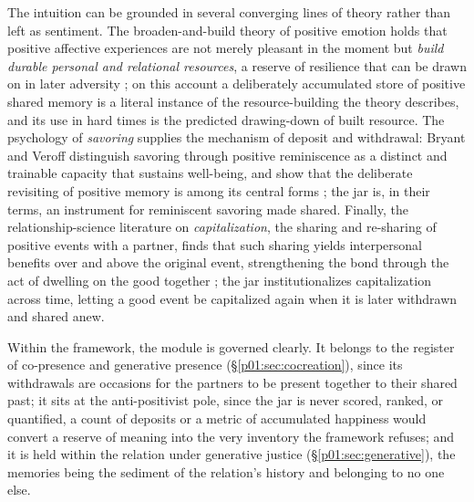 \documentclass[11pt,a4paper]{article}
\begin{document}
The intuition can be grounded in several converging lines of theory rather than left as sentiment. The broaden-and-build theory of positive emotion holds that positive affective experiences are not merely pleasant in the moment but \emph{build durable personal and relational resources}, a reserve of resilience that can be drawn on in later adversity \parencite{fredrickson2001role}; on this account a deliberately accumulated store of positive shared memory is a literal instance of the resource-building the theory describes, and its use in hard times is the predicted drawing-down of built resource. The psychology of \emph{savoring} supplies the mechanism of deposit and withdrawal: Bryant and Veroff distinguish savoring through positive reminiscence as a distinct and trainable capacity that sustains well-being, and show that the deliberate revisiting of positive memory is among its central forms \parencite{bryant2007savoring}; the jar is, in their terms, an instrument for reminiscent savoring made shared. Finally, the relationship-science literature on \emph{capitalization}, the sharing and re-sharing of positive events with a partner, finds that such sharing yields interpersonal benefits over and above the original event, strengthening the bond through the act of dwelling on the good together \parencite{gable2004what}; the jar institutionalizes capitalization across time, letting a good event be capitalized again when it is later withdrawn and shared anew.

Within the framework, the module is governed clearly. It belongs to the register of co-presence and generative presence (§\ref{p01:sec:cocreation}), since its withdrawals are occasions for the partners to be present together to their shared past; it sits at the anti-positivist pole, since the jar is never scored, ranked, or quantified, a count of deposits or a metric of accumulated happiness would convert a reserve of meaning into the very inventory the framework refuses; and it is held within the relation under generative justice (§\ref{p01:sec:generative}), the memories being the sediment of the relation's history and belonging to no one else.
\end{document}
